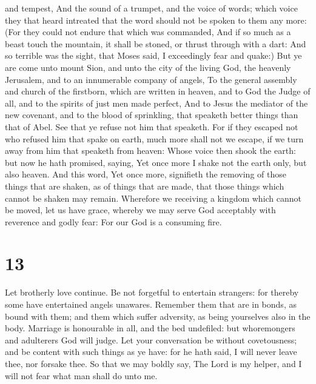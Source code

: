 and tempest,  And the sound of a trumpet, and the voice
of words; which voice they that heard intreated that the word should not
be spoken to them any more:  (For they could not endure
that which was commanded, And if so much as a beast touch the mountain,
it shall be stoned, or thrust through with a dart:  And
so terrible was the sight, that Moses said, I exceedingly fear and
quake:)  But ye are come unto mount Sion, and unto the
city of the living God, the heavenly Jerusalem, and to an innumerable
company of angels,  To the general assembly and church of
the firstborn, which are written in heaven, and to God the Judge of all,
and to the spirits of just men made perfect,  And to
Jesus the mediator of the new covenant, and to the blood of sprinkling,
that speaketh better things than that of Abel.  See that
ye refuse not him that speaketh. For if they escaped not who refused him
that spake on earth, much more shall not we escape, if we turn away from
him that speaketh from heaven:  Whose voice then shook
the earth: but now he hath promised, saying, Yet once more I shake not
the earth only, but also heaven.  And this word, Yet once
more, signifieth the removing of those things that are shaken, as of
things that are made, that those things which cannot be shaken may
remain.  Wherefore we receiving a kingdom which cannot be
moved, let us have grace, whereby we may serve God acceptably with
reverence and godly fear:  For our God is a consuming
fire.

\hypertarget{section-12}{%
\section{13}\label{section-12}}

 Let brotherly love continue.  Be not
forgetful to entertain strangers: for thereby some have entertained
angels unawares.  Remember them that are in bonds, as
bound with them; and them which suffer adversity, as being yourselves
also in the body.  Marriage is honourable in all, and the
bed undefiled: but whoremongers and adulterers God will judge.
 Let your conversation be without covetousness; and be
content with such things as ye have: for he hath said, I will never
leave thee, nor forsake thee.  So that we may boldly say,
The Lord is my helper, and I will not fear what man shall do unto me.

